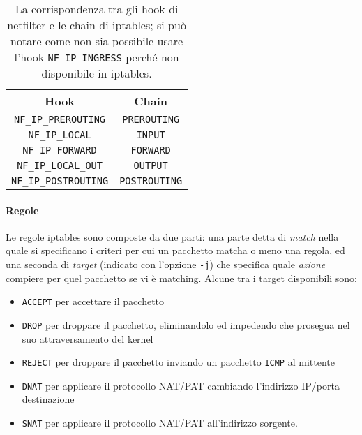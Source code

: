 \begin{table}[h]\label{tbl:iptables-chain}
  \begin{tabular}{|c|c|}
    \hline
    Hook & Chain \\
    \hline
    \hline
    \texttt{NF\_IP\_PREROUTING} & \texttt{PREROUTING}\\
    \hline
    \texttt{NF\_IP\_LOCAL} & \texttt{INPUT}\\
    \hline
    \texttt{NF\_IP\_FORWARD} & \texttt{FORWARD}\\
    \hline
    \texttt{NF\_IP\_LOCAL\_OUT} & \texttt{OUTPUT}\\
    \hline
    \texttt{NF\_IP\_POSTROUTING} & \texttt{POSTROUTING}\\
    \hline
  \end{tabular}
  \caption[La corrispondenza tra gli hook di netfilter e le chain di iptables.]
  {La corrispondenza tra gli hook di netfilter e le chain di iptables; si può notare
  come non sia possibile usare l'hook \texttt{NF\_IP\_INGRESS} perché non disponibile in
  iptables.}
\end{table}


\paragraph{Regole}
Le regole iptables sono composte da due parti: una parte detta di \textit{match}
nella quale si specificano i criteri per cui un pacchetto matcha o meno una regola,
ed una seconda di \textit{target} (indicato con l'opzione \texttt{-j}) che specifica quale
\textit{azione} compiere per quel pacchetto se vi è matching. Alcune tra i
target disponibili sono:
\begin{itemize}
  \item \texttt{ACCEPT} per accettare il pacchetto
  \item \texttt{DROP} per droppare il pacchetto, eliminandolo ed impedendo che
  prosegua nel suo attraversamento del kernel
  \item \texttt{REJECT} per droppare il pacchetto inviando un pacchetto
  \texttt{ICMP} al mittente
  \item \texttt{DNAT} per applicare il protocollo NAT/PAT cambiando l'indirizzo
  IP/porta destinazione
  \item \texttt{SNAT} per applicare il protocollo NAT/PAT all'indirizzo sorgente.
\end{itemize}


